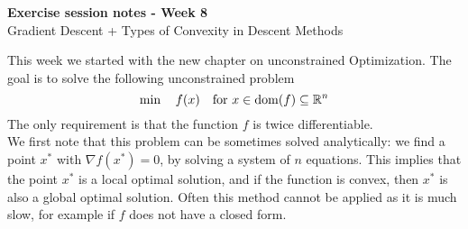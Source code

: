 \documentclass[answers]{exam}
\begin{document}
	$ $
	\begin{center}
		\huge \textbf{Exercise session notes - Week 8}  \\ \vspace*{3mm}
        \Large{Gradient Descent + Types of Convexity in Descent Methods}
	\end{center}
	$ $\\

    \noindent This week we started with the new chapter on unconstrained Optimization. The goal is to solve the following unconstrained problem
    $$ \min\quad  f(x) \quad\text{for } x\in \operatorname{dom}(f)\subseteq \mathbb{R}^n $$
    The only requirement is that the function $f$ is twice differentiable.\\
    We first note that this problem can be sometimes solved analytically: we find a point $x^*$ with $\nabla f(x^*) = 0$, by solving a system of $n$ equations. This implies that the point $x^*$ is a local optimal solution, and if the function is convex, then $x^*$ is also a global optimal solution. Often this method cannot be applied as it is much slow, for example if $f$ does not have a closed form.
\end{document}
